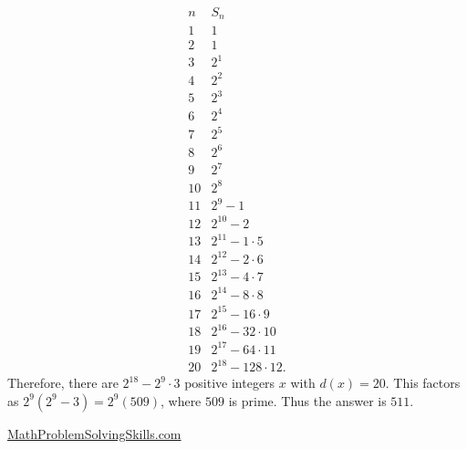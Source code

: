\begin{enumerate}
 \[\begin{array}{c|l} n&S_n\\\hline 1&1\\ 2&1\\ 3&2^1\\ 4&2^2\\ 5&2^3\\ 6&2^4\\ 7&2^5\\ 8&2^6\\ 9&2^7\\ 10&2^8\\ 11&2^9-1\\ 12&2^{10}-2\\ 13&2^{11}-1\cdot 5\\ 14&2^{12}-2\cdot 6\\ 15&2^{13}-4\cdot 7\\ 16&2^{14}-8\cdot 8\\ 17&2^{15}-16\cdot 9\\ 18&2^{16}-32\cdot 10\\ 19&2^{17}-64\cdot 11\\ 20&2^{18}-128\cdot 12. \end{array}\]Therefore, there are $2^{18}- 2^9\cdot 3$ positive integers $x$ with $d(x)=20$. This factors as $2^9(2^{9}-3)=2^9(509)$, where $509$ is prime. Thus the answer is $\boxed{511}$.

 \href{https://mathproblemsolvingskills.wordpress.com/}{MathProblemSolvingSkills.com}

 


 


\end{enumerate}